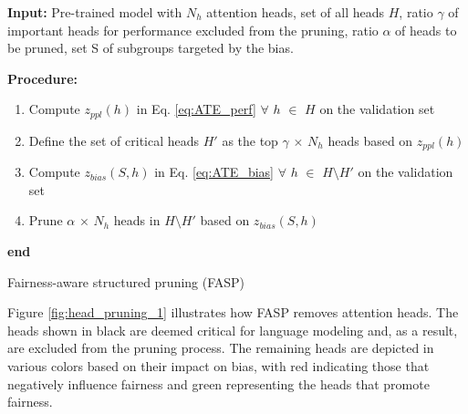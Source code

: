 \documentclass[letterpaper]{article} %
\begin{document}
\begin{algorithm}[H]
\textbf{Input:} Pre-trained model with $N_h$ attention heads, set of all heads $H$, ratio $\gamma$ of important heads for performance excluded from the pruning, ratio $\alpha$ of heads to be pruned, set S of subgroups targeted by the bias.

{
\textbf{Procedure:}
\begin{enumerate}
\item Compute $z_{ppl}(h)$ in Eq. \eqref{eq:ATE_perf} $\forall$ $h$ $\in$ $H$ on the validation set
\item Define the set of critical heads  $H'$ as the top $\gamma$ $\times$ $N_h$ heads based on $z_{ppl}(h)$
\item Compute $z_{bias}(S,h)$ in Eq. \eqref{eq:ATE_bias} $\forall$ $h$ $\in$ $H\setminus H'$ {on the validation  set}
\item Prune $\alpha$ $\times$ $N_h$ heads in  $H\setminus H'$ based on $z_{bias}(S,h)$
\end{enumerate}

\textbf{end}}
\caption{Fairness-aware structured pruning (FASP)}
\end{algorithm}

Figure \ref{fig:head_pruning_1} illustrates how FASP removes attention heads. The heads shown in black are deemed critical for language modeling and, as a result, are excluded from the pruning process. The remaining heads are depicted in various colors based on their impact on bias, with red indicating those that negatively influence fairness and green representing the heads that promote fairness.
\end{document}
